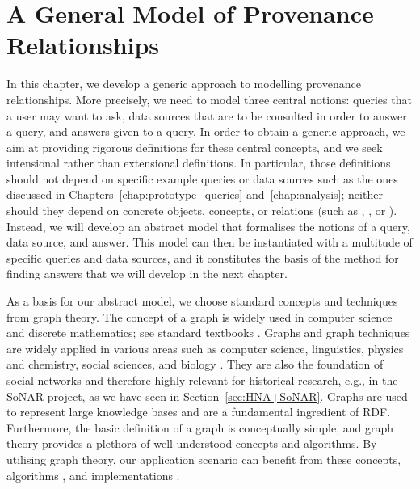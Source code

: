 \chapter{A General Model of Provenance Relationships}
\label{chap:modelling}

In this chapter, we develop a generic approach to modelling provenance relationships.
More precisely, we need to model three central notions: queries that a user may want to ask,
data sources that are to be consulted in order to answer a query,
and answers given to a query.
In order to obtain a generic approach, we aim at providing rigorous definitions
for these central concepts, and we seek intensional rather than extensional definitions.
In particular, those definitions should not depend on specific example queries or data sources
such as the ones discussed in Chapters~\ref{chap:prototype_queries} and~\ref{chap:analysis};
neither should they depend on concrete objects, concepts, or relations
(such as , , or ).
Instead, we will develop an abstract model that formalises
the notions of a query, data source, and answer.
This model can then be instantiated with a multitude of specific queries and data sources,
and it constitutes the basis of the method for finding answers
that we will develop in the next chapter.

As a basis for our abstract model, we choose standard concepts and techniques
from graph theory.
The concept of a graph is widely used in computer science and discrete mathematics;
see standard textbooks \autocite[e.g.,][]{Diestel2012}.
Graphs and graph techniques are widely applied in various areas such as 
computer science, linguistics, physics and chemistry,
social sciences, and biology \autocite{WikiGraphTheoryApplications}.
They are also the foundation of social networks \autocite{Galety2022}
and therefore highly relevant for historical research, e.g.,
in the \gls{SoNAR} project, as we have seen in Section~\ref{sec:HNA+SoNAR}.
Graphs
are used to represent large knowledge bases \autocite[e.g.,][]{Ehrlinger2016}
and are a fundamental ingredient of \gls{RDF}.
Furthermore, the basic definition of a graph is conceptually simple,
and graph theory provides a plethora of well-understood concepts
and algorithms. By utilising graph theory, our application scenario
can benefit from these concepts, algorithms \autocite{Diestel2012,Even2012},
and implementations \autocite{PythonGraphLibraries,JGraphT}.

